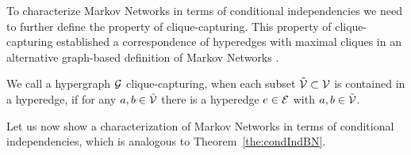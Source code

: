 To characterize Markov Networks in terms of conditional independencies we need to further define the property of clique-capturing.
This property of clique-capturing established a correspondence of hyperedges with maximal cliques in an alternative graph-based definition of Markov Networks \cite{koller_probabilistic_2009}.

\begin{definition}\label{def:ccHypergraph}
	We call a hypergraph $\mathcal{G}$ clique-capturing, when each subset $\tilde{\mathcal{V}}\subset\mathcal{V}$ is contained in a hyperedge, if for any $a,b\in\tilde{\mathcal{V}}$ there is a hyperedge $e\in\mathcal{E}$ with $a,b\in\tilde{\mathcal{V}}$.
\end{definition}

Let us now show a characterization of Markov Networks in terms of conditional independencies, which is analogous to Theorem~\ref{the:condIndBN}.

